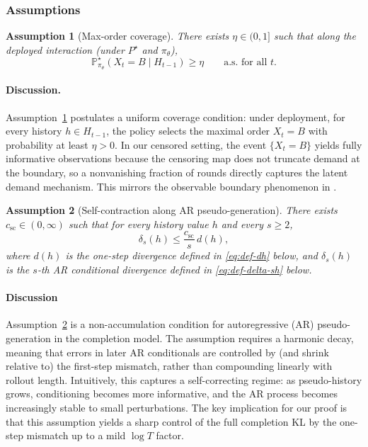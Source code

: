 \documentclass[11pt]{article}
\newtheorem{assumption}{Assumption}
\begin{document}
\subsubsection{Assumptions}
\label{apx:thm_3_asm}

\begin{assumption}[Max-order coverage]\label{ass:coverage}
There exists $\eta\in(0,1]$ such that along the deployed interaction (under $P^\star$ and $\pi_\theta$),
\[
\mathbb{P}^\star_{\pi_\theta}(X_t=B \mid H_{t-1}) \ge \eta\qquad\text{a.s. for all }t.
\]
\end{assumption}

\paragraph{Discussion.}
Assumption~\ref{ass:coverage} postulates a uniform coverage condition: under deployment, for every history $h\in H_{t-1}$,
the policy selects the maximal order $X_t=B$ with probability at least $\eta>0$. In our censored setting,
the event $\{X_t=B\}$ yields fully informative observations because the censoring map does not
truncate demand at the boundary, so a nonvanishing fraction of rounds directly captures the latent demand
mechanism. This mirrors the observable boundary phenomenon in \citet{hssaine2024censored}.

 


\begin{assumption}[Self-contraction along AR pseudo-generation]\label{ass:self-contraction}
There exists $c_{\mathrm{sc}}\in(0,\infty)$ such that for every history value $h$ and every $s\ge 2$,
\[
\delta_s(h) \le \frac{c_{\mathrm{sc}}}{s}\, d(h),
\]
where $d(h)$ is the one-step divergence defined in \eqref{eq:def-dh} below, and $\delta_s(h)$ is the $s$-th AR conditional divergence
defined in \eqref{eq:def-delta-sh} below.
\end{assumption}

\paragraph{Discussion}
Assumption~\ref{ass:self-contraction} is a non-accumulation condition for autoregressive (AR) pseudo-generation in the completion model. The assumption requires a harmonic decay, meaning that errors in later AR conditionals are controlled by (and shrink relative to) the first-step mismatch, rather than compounding linearly with rollout length. Intuitively, this captures a self-correcting regime: as pseudo-history grows, conditioning becomes more informative, and the AR process becomes increasingly stable to small perturbations. The key implication for our proof is that this assumption yields a sharp control of the full completion KL by the one-step mismatch up to a mild $\log T$ factor.
\end{document}
